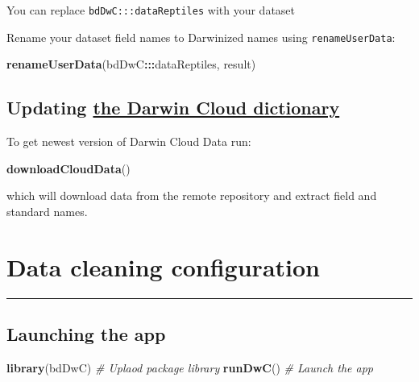 \documentclass[]{book}
\newenvironment{Shaded}{\begin{snugshade}}{\end{snugshade}}
\newcommand{\KeywordTok}[1]{\textcolor[rgb]{0.13,0.29,0.53}{\textbf{#1}}}
\newcommand{\CommentTok}[1]{\textcolor[rgb]{0.56,0.35,0.01}{\textit{#1}}}
\newcommand{\OperatorTok}[1]{\textcolor[rgb]{0.81,0.36,0.00}{\textbf{#1}}}
\newcommand{\NormalTok}[1]{#1}
\begin{document}
You can replace \texttt{bdDwC:::dataReptiles} with your dataset

Rename your dataset field names to Darwinized names using
\texttt{renameUserData}:

\begin{Shaded}
\begin{Highlighting}[]
\KeywordTok{renameUserData}\NormalTok{(bdDwC}\OperatorTok{:::}\NormalTok{dataReptiles, result)}
\end{Highlighting}
\end{Shaded}

\section{\texorpdfstring{Updating
\protect\hyperlink{the-darwin-cloud-dictionary}{the Darwin Cloud
dictionary}}{Updating the Darwin Cloud dictionary}}\label{updating-the-darwin-cloud-dictionary}

To get newest version of Darwin Cloud Data run:

\begin{Shaded}
\begin{Highlighting}[]
\KeywordTok{downloadCloudData}\NormalTok{()}
\end{Highlighting}
\end{Shaded}

which will download data from the remote repository and extract field
and standard names.

\chapter{Data cleaning configuration}\label{data-cleaning-configuration}

\begin{center}\rule{0.5\linewidth}{\linethickness}\end{center}

\section{Launching the app}\label{launching-the-app}

\begin{Shaded}
\begin{Highlighting}[]
\KeywordTok{library}\NormalTok{(bdDwC) }\CommentTok{# Uplaod package library}
\KeywordTok{runDwC}\NormalTok{() }\CommentTok{# Launch the app}
\end{Highlighting}
\end{Shaded}
\end{document}
